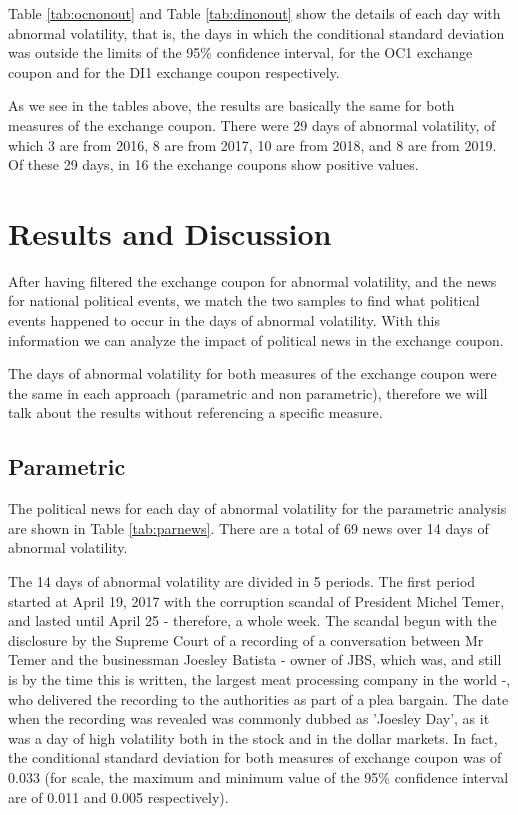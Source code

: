 \documentclass[cic,tc, english]{iiufrgs}
\begin{document}
    

    

    Table \ref{tab:ocnonout} and Table \ref{tab:dinonout} show the details of each day with abnormal volatility, that is, the days in which the conditional standard deviation was outside the limits of the 95\% confidence interval, for the OC1 exchange coupon and for the DI1 exchange coupon respectively.

    

    

    As we see in the tables above, the results are basically the same for both measures of the exchange coupon. There were 29 days of abnormal volatility, of which 3 are from 2016, 8 are from 2017, 10 are from 2018, and 8 are from 2019. Of these 29 days, in 16 the exchange coupons show positive values.

\chapter{Results and Discussion} \label{chapter_results_discussion}

    After having filtered the exchange coupon for abnormal volatility, and the news for national political events, we match the two samples to find what political events happened to occur in the days of abnormal volatility. With this information we can analyze the impact of political news in the exchange coupon.

    The days of abnormal volatility for both measures of the exchange coupon were the same in each approach (parametric and non parametric), therefore we will talk about the results without referencing a specific measure.

\section{Parametric}

    The political news for each day of abnormal volatility for the parametric analysis are shown in Table \ref{tab:parnews}. There are a total of 69 news over 14 days of abnormal volatility.

    

    The 14 days of abnormal volatility are divided in 5 periods. The first period started at April 19, 2017 with the corruption scandal of President Michel Temer, and lasted until April 25 - therefore, a whole week. The scandal begun with the disclosure by the Supreme Court of a recording of a conversation between Mr Temer and the businessman Joesley Batista - owner of JBS, which was, and still is by the time this is written, the largest meat processing company in the world -, who delivered the recording to the authorities as part of a plea bargain. The date when the recording was revealed was commonly dubbed as 'Joesley Day', as it was a day of high volatility both in the stock and in the dollar markets. In fact, the conditional standard deviation for both measures of exchange coupon was of 0.033 (for scale, the maximum and minimum value of the 95\% confidence interval are of 0.011 and 0.005 respectively).
\end{document}
